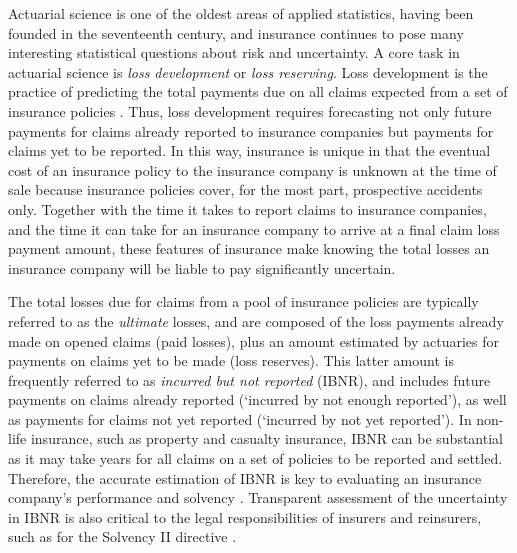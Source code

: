 Actuarial science is one of the oldest areas
of applied statistics, 
having been founded in the seventeenth
century, and insurance continues to pose
many interesting statistical questions
about risk and uncertainty.
A core task in actuarial science is
\textit{loss development} or \textit{loss reserving}.
Loss development is the practice of
predicting the total 
payments due on all 
claims expected from
a set of insurance policies \citep{englandverrall2002,zhang2012}.
Thus, loss development requires
forecasting not only future payments for
claims already reported to insurance companies 
but payments for claims yet to be reported.
In this way, insurance is unique in that 
the eventual cost of 
an insurance policy to the insurance
company is unknown at the time of sale
because insurance policies cover, for the most part,
prospective accidents only.
Together with the time it takes to report claims
to insurance companies, and the time it can
take for an insurance company to arrive
at a final claim loss payment amount,
these features of insurance make knowing
the total losses an insurance company will
be liable to pay significantly uncertain. 

The total losses due for claims
from a pool of insurance policies
are typically referred to as
the \textit{ultimate} losses, and are composed
of the loss payments already made on opened
claims (paid losses), plus an amount estimated by actuaries
for payments on claims yet to be made (loss reserves).
This latter amount is frequently referred to as
\textit{incurred but not reported} (IBNR), and
includes future payments on
claims already reported (`incurred by not enough reported'),
as well as payments for claims not yet reported (`incurred by not
yet reported').
In non-life insurance, 
such as property and casualty insurance,
IBNR can be substantial as it may
take years for all claims on a set of policies to be reported and settled.
Therefore, the accurate estimation of IBNR is key to evaluating an insurance company's
performance and solvency \citep{beard1960,bornhuetter1972,friedland2010,englandverrall2002,wuthrich2008}.
Transparent assessment of the uncertainty in IBNR 
is also critical to the legal responsibilities
of insurers and reinsurers, such as for the Solvency II directive
\citep{england2019,frohlich2018,munroe2018}.

